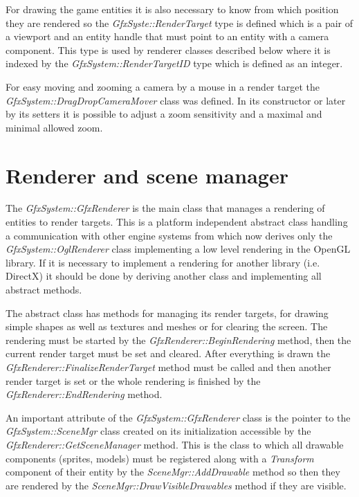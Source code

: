 \documentclass[a4paper, 12pt]{report}
\begin{document}
For drawing the game entities it is also necessary to know from which position they are rendered so the \emph{GfxSyste::RenderTarget} type is defined which is a pair of a viewport and an entity handle that must point to an entity with a camera component. This type is used by renderer classes described below where it is indexed by the \emph{GfxSystem::RenderTargetID} type which is defined as an integer.

For easy moving and zooming a camera by a mouse in a render target the \emph{GfxSystem::DragDropCameraMover} class was defined. In its constructor or later by its setters it is possible to adjust a zoom sensitivity and a maximal and minimal allowed zoom.

\section{Renderer and scene manager}

The \emph{GfxSystem::GfxRenderer} is the main class that manages a rendering of entities to render targets. This is a platform independent abstract class handling a communication with other engine systems from which now derives only the \emph{GfxSystem::OglRenderer} class implementing a low level rendering in the OpenGL \cite{opengl} library. If it is necessary to implement a rendering for another library (i.e. DirectX) it should be done by deriving another class and implementing all abstract methods.

The abstract class has methods for managing its render targets, for drawing simple shapes as well as textures and meshes or for clearing the screen. The rendering must be started by the \emph{GfxRenderer::BeginRendering} method, then the current render target must be set and cleared. After everything is drawn the \emph{GfxRenderer::FinalizeRenderTarget} method must be called and then another render target is set or the whole rendering is finished by the \emph{GfxRenderer::EndRendering} method.

An important attribute of the \emph{GfxSystem::GfxRenderer} class is the point\-er to the \emph{GfxSystem::SceneMgr} class created on its initialization accessible by the \emph{GfxRenderer::GetSceneManager} method. This is the class to which all drawable components (sprites, models) must be registered along with a \emph{Transform} component of their entity by the \emph{SceneMgr::AddDrawable} method so then they are rendered by the \emph{SceneMgr::DrawVisibleDrawables} method if they are visible.
\end{document}
